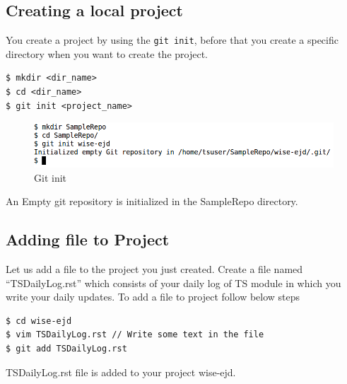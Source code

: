 \documentclass[11pt,a4paper]{article}
\begin{document}
\subsection*{Creating a local project}
You create a project by using the \texttt{git init}, before that you create a specific directory when you want to create the project.

\begin{verbatim}
$ mkdir <dir_name>
$ cd <dir_name>
$ git init <project_name>
\end{verbatim}

\begin{figure}[H]
    \begin{center}
        \includegraphics[scale=0.5]{CreatingProject1.png}
\caption{Git init}
     \end{center}
    \end{figure}

An Empty git repository is initialized in the SampleRepo directory. 

\subsection*{Adding file to Project}
Let us add a file to the project you just created. Create a file named ``TSDailyLog.rst'' which consists of your daily log of TS module in which you write your daily updates. To add a file to project follow below steps
\begin{verbatim}
$ cd wise-ejd
$ vim TSDailyLog.rst // Write some text in the file
$ git add TSDailyLog.rst
\end{verbatim}

TSDailyLog.rst file is added to your project wise-ejd.
\end{document}
